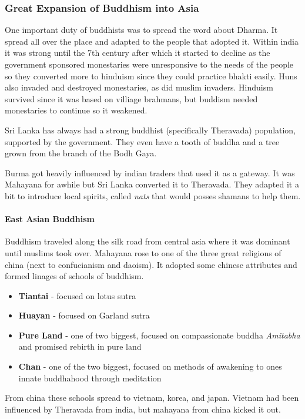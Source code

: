 \documentclass{article}
\begin{document}
\subsubsection*{Great Expansion of Buddhism into Asia}
\label{ssub:great_expansion_of_buddhism_into_asia}
One important duty of buddhists was to spread the word about Dharma. It spread all over the place and adapted to the people that adopted it. Within india it was strong until the 7th century after which it started to decline as the government sponsored monestaries were unresponsive to the needs of the people so they converted more to hinduism since they could practice bhakti easily. Huns also invaded and destroyed monestaries, as did muslim invaders. Hinduism survived since it was based on villiage brahmans, but buddism needed monestaries to continue so it weakened.

Sri Lanka has always had a strong buddhist (specifically Theravada) population, supported by the government. They even have a tooth of buddha and a tree grown from the branch of the Bodh Gaya.

Burma got heavily influenced by indian traders that used it as a gateway. It was Mahayana for awhile but Sri Lanka converted it to Theravada. They adapted it a bit to introduce local spirits, called \emph{nats} that would posses shamans to help them.

\paragraph{East Asian Buddhism}
\label{par:east_asian_buddhism}
Buddhism traveled along the silk road from central asia where it was dominant until muslims took over. Mahayana rose to one of the three great religions of china (next to confucianism and daoism). It adopted some chinese attributes and formed linages of schools of buddhism.
\begin{itemize}
	\item \textbf{Tiantai} - focused on lotus sutra
	\item \textbf{Huayan} - focused on Garland sutra
	\item \textbf{Pure Land} - one of two biggest, focused on compassionate buddha \emph{Amitabha} and promised rebirth in pure land
	\item \textbf{Chan} - one of the two biggest, focused on methods of awakening to ones innate buddhahood through meditation
\end{itemize}

From china these schools spread to vietnam, korea, and japan. Vietnam had been influenced by Theravada from india, but mahayana from china kicked it out.
\end{document}
